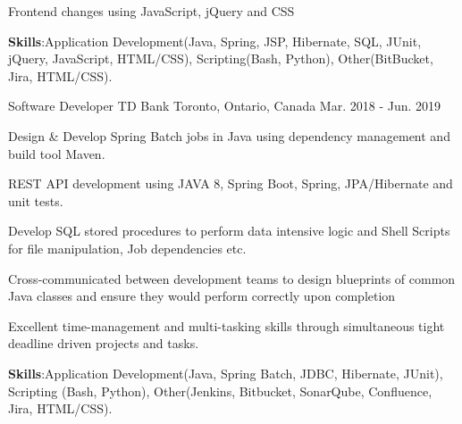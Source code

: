 \begin{cventries}
{\begin{cvitems}
        \item { Frontend changes using JavaScript, jQuery and CSS }
        \vspace{1mm} %
        \item {\textbf{Skills}:Application Development(Java, Spring, JSP, Hibernate, SQL, JUnit,
        jQuery, JavaScript, HTML/CSS), Scripting(Bash, Python), Other(BitBucket, Jira, HTML/CSS).}
      \end{cvitems}
    }
    \vspace{5mm} %
  \cventry
    {Software Developer} %
    {TD Bank} %
    {Toronto, Ontario, Canada} %
    {Mar. 2018 - Jun. 2019} %
    {
      \begin{cvitems} %
        \item {Design \& Develop Spring Batch jobs in Java using dependency management and build tool Maven.}
        \item {REST API development using JAVA 8, Spring Boot, Spring, JPA/Hibernate and unit tests.}
        \item {Develop SQL stored procedures to perform data intensive logic and Shell Scripts for file manipulation, Job dependencies etc. }
        \item {Cross-communicated between development teams to design blueprints of common Java classes and ensure they would perform correctly upon completion}
        \item {Excellent time-management and multi-tasking skills through simultaneous tight deadline driven projects and tasks.}
        \vspace{1mm} %
        \item {\textbf{Skills}:Application Development(Java, Spring Batch, JDBC, Hibernate, JUnit), Scripting (Bash, Python), Other(Jenkins, Bitbucket, SonarQube, Confluence, Jira, HTML/CSS).}
      \end{cvitems}
    }

\end{cventries}
